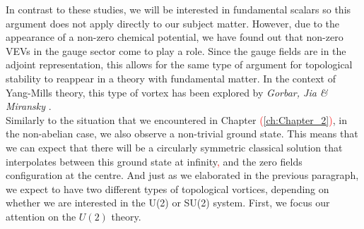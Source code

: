 \indent In contrast to these studies, we will be interested in fundamental scalars so this argument does not apply directly to our subject matter. However, due to the appearance of a non-zero chemical potential, we have found out that non-zero VEVs in the gauge sector come to play a role. Since the gauge fields are in the adjoint representation, this allows for the same type of argument for topological stability to reappear in a theory with fundamental matter. In the context of Yang-Mills theory, this type of vortex has been explored by \textit{Gorbar, Jia \& Miransky} \cite{Gorbar:2005pi}.\\  
\indent Similarly to the situation that we encountered in Chapter \textcolor{red}{(}\ref{ch:Chapter_2}\textcolor{red}{)}, in the non-abelian case, we also observe a non-trivial ground state. This means that we can expect that there will be a circularly symmetric classical solution that interpolates between this ground state at infinity\textcolor{red}{,} and the zero fields configuration at the centre. And just as we elaborated in the previous paragraph, we expect to have two different types of topological vortices, depending on whether we are interested in the U(2) or SU(2) system. First, we focus our attention on the $U(2)$ theory.
